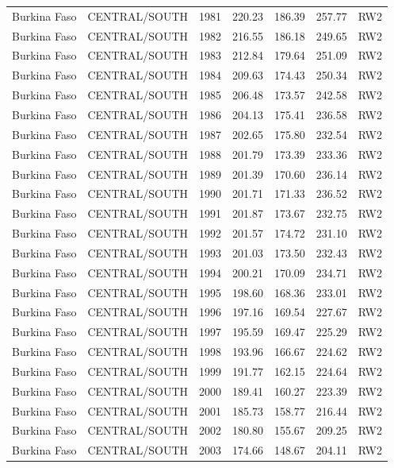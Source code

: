 \begin{longtable}{lllrrrl}
  Burkina Faso & CENTRAL/SOUTH & 1981 & 220.23 & 186.39 & 257.77 & RW2 \\ 
  Burkina Faso & CENTRAL/SOUTH & 1982 & 216.55 & 186.18 & 249.65 & RW2 \\ 
  Burkina Faso & CENTRAL/SOUTH & 1983 & 212.84 & 179.64 & 251.09 & RW2 \\ 
  Burkina Faso & CENTRAL/SOUTH & 1984 & 209.63 & 174.43 & 250.34 & RW2 \\ 
  Burkina Faso & CENTRAL/SOUTH & 1985 & 206.48 & 173.57 & 242.58 & RW2 \\ 
  Burkina Faso & CENTRAL/SOUTH & 1986 & 204.13 & 175.41 & 236.58 & RW2 \\ 
  Burkina Faso & CENTRAL/SOUTH & 1987 & 202.65 & 175.80 & 232.54 & RW2 \\ 
  Burkina Faso & CENTRAL/SOUTH & 1988 & 201.79 & 173.39 & 233.36 & RW2 \\ 
  Burkina Faso & CENTRAL/SOUTH & 1989 & 201.39 & 170.60 & 236.14 & RW2 \\ 
  Burkina Faso & CENTRAL/SOUTH & 1990 & 201.71 & 171.33 & 236.52 & RW2 \\ 
  Burkina Faso & CENTRAL/SOUTH & 1991 & 201.87 & 173.67 & 232.75 & RW2 \\ 
  Burkina Faso & CENTRAL/SOUTH & 1992 & 201.57 & 174.72 & 231.10 & RW2 \\ 
  Burkina Faso & CENTRAL/SOUTH & 1993 & 201.03 & 173.50 & 232.43 & RW2 \\ 
  Burkina Faso & CENTRAL/SOUTH & 1994 & 200.21 & 170.09 & 234.71 & RW2 \\ 
  Burkina Faso & CENTRAL/SOUTH & 1995 & 198.60 & 168.36 & 233.01 & RW2 \\ 
  Burkina Faso & CENTRAL/SOUTH & 1996 & 197.16 & 169.54 & 227.67 & RW2 \\ 
  Burkina Faso & CENTRAL/SOUTH & 1997 & 195.59 & 169.47 & 225.29 & RW2 \\ 
  Burkina Faso & CENTRAL/SOUTH & 1998 & 193.96 & 166.67 & 224.62 & RW2 \\ 
  Burkina Faso & CENTRAL/SOUTH & 1999 & 191.77 & 162.15 & 224.64 & RW2 \\ 
  Burkina Faso & CENTRAL/SOUTH & 2000 & 189.41 & 160.27 & 223.39 & RW2 \\ 
  Burkina Faso & CENTRAL/SOUTH & 2001 & 185.73 & 158.77 & 216.44 & RW2 \\ 
  Burkina Faso & CENTRAL/SOUTH & 2002 & 180.80 & 155.67 & 209.25 & RW2 \\ 
  Burkina Faso & CENTRAL/SOUTH & 2003 & 174.66 & 148.67 & 204.11 & RW2 \\ 

\end{longtable}
